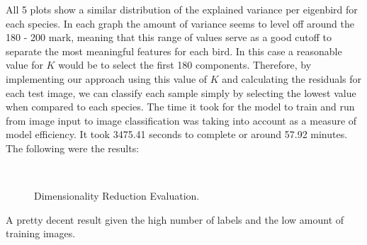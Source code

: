 \documentclass[11pt]{article}
\begin{document}
\begin{singlespace}
All 5 plots show a similar distribution of the explained variance per eigenbird for each species. In each graph the amount of variance seems to level off around the 180 - 200 mark, meaning that this range of values serve as a good cutoff to separate the most meaningful features for each bird. In this case a reasonable value for $K$ would be to select the first 180 components. Therefore, by implementing our approach using this value of $K$ and calculating the residuals for each test image, we can classify each sample simply by selecting the lowest value when compared to each species. The time it took for the model to train and run from image input to image classification was taking into account as a measure of model efficiency. It took 3475.41 seconds to complete or around 57.92 minutes. The following were the results: 

\begin{figure}[h]
    \centering
    
     \\
    \caption{Dimensionality Reduction Evaluation.}
\end{figure} 

A pretty decent result given the high number of labels and the low amount of training images. \\



\end{singlespace}
\end{document}
